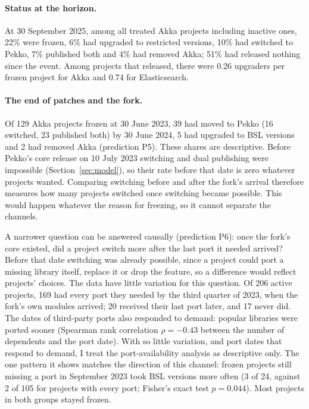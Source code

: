 \documentclass[11pt]{article}
\begin{document}
\paragraph{Status at the horizon.} At 30 September 2025, among all treated Akka projects including inactive ones, 22\% were frozen, 6\% had upgraded to restricted versions, 10\% had switched to Pekko, 7\% published both and 4\% had removed Akka; 51\% had released nothing since the event. Among projects that released, there were 0.26 upgraders per frozen project for Akka and 0.74 for Elasticsearch.

\paragraph{The end of patches and the fork.} Of 129 Akka projects frozen at 30 June 2023, 39 had moved to Pekko (16 switched, 23 published both) by 30 June 2024, 5 had upgraded to BSL versions and 2 had removed Akka (prediction P5). These shares are descriptive. Before Pekko's core release on 10 July 2023 switching and dual publishing were impossible (Section~\ref{sec:model}), so their rate before that date is zero whatever projects wanted. Comparing switching before and after the fork's arrival therefore measures how many projects switched once switching became possible. This would happen whatever the reason for freezing, so it cannot separate the channels.

A narrower question can be answered causally (prediction P6): once the fork's core existed, did a project switch more after the last port it needed arrived? Before that date switching was already possible, since a project could port a missing library itself, replace it or drop the feature, so a difference would reflect projects' choices. The data have little variation for this question. Of 206 active projects, 169 had every port they needed by the third quarter of 2023, when the fork's own modules arrived; 20 received their last port later, and 17 never did. The dates of third-party ports also responded to demand: popular libraries were ported sooner (Spearman rank correlation $\rho=-0.43$ between the number of dependents and the port date). With so little variation, and port dates that respond to demand, I treat the port-availability analysis as descriptive only. The one pattern it shows matches the direction of this channel: frozen projects still missing a port in September 2023 took BSL versions more often (3 of 24, against 2 of 105 for projects with every port; Fisher's exact test $p=0.044$). Most projects in both groups stayed frozen.
\end{document}
